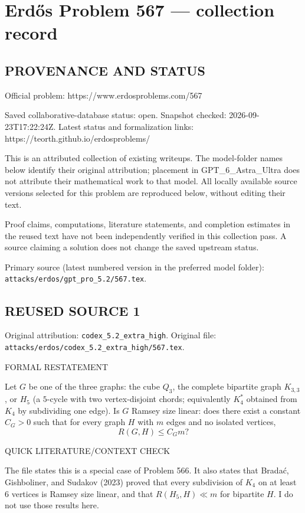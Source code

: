 \section*{Erd\H{o}s Problem 567 --- collection record}

\subsection*{PROVENANCE AND STATUS}
Official problem: https://www.erdosproblems.com/567

Saved collaborative-database status: open.
Snapshot checked: 2026-09-23T17:22:24Z.
Latest status and formalization links: https://teorth.github.io/erdosproblems/

This is an attributed collection of existing writeups. The model-folder names below identify their original attribution; placement in GPT\_6\_Astra\_Ultra does not attribute their mathematical work to that model. All locally available source versions selected for this problem are reproduced below, without editing their text.

Proof claims, computations, literature statements, and completion estimates in the reused text have not been independently verified in this collection pass. A source claiming a solution does not change the saved upstream status.

Primary source (latest numbered version in the preferred model folder): \texttt{attacks/erdos/gpt\_pro\_5.2/567.tex}.

\subsection*{REUSED SOURCE 1}
Original attribution: \texttt{codex\_5.2\_extra\_high}.
Original file: \texttt{attacks/erdos/codex\_5.2\_extra\_high/567.tex}.

FORMAL RESTATEMENT

Let $G$ be one of the three graphs: the cube $Q_3$, the complete bipartite graph $K_{3,3}$, or $H_5$ (a $5$-cycle with two vertex-disjoint chords; equivalently $K_4^*$ obtained from $K_4$ by subdividing one edge).
Is $G$ Ramsey size linear: does there exist a constant $C_G>0$ such that for every graph $H$ with $m$ edges and no isolated vertices,
\[
R(G,H) \le C_G m?
\]

QUICK LITERATURE/CONTEXT CHECK

The file states this is a special case of Problem 566.
It also states that Brada\'c, Gishboliner, and Sudakov (2023) proved that every subdivision of $K_4$ on at least $6$ vertices is Ramsey size linear, and that $R(H_5,H)\ll m$ for bipartite $H$.
I do not use those results here.

